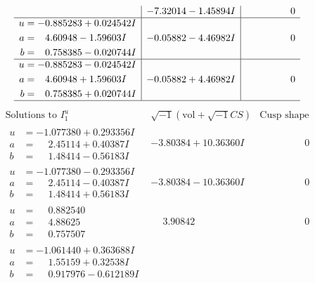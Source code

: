 \documentclass[1p]{elsarticle_modified}
\theoremstyle{definition}
\newcommand{\I}{\sqrt{-1}}
\begin{document}
$$\begin{array}{c|c|c}
 & -7.32014 - 1.45894 I & \phantom{-0.000000 } 0 \\ \hline\begin{aligned}
u &= -0.885283 + 0.024542 I \\
a &= \phantom{-}4.60948 - 1.59603 I \\
b &= \phantom{-}0.758385 - 0.020744 I\end{aligned}
 & -0.05882 - 4.46982 I & \phantom{-0.000000 } 0 \\ \hline\begin{aligned}
u &= -0.885283 - 0.024542 I \\
a &= \phantom{-}4.60948 + 1.59603 I \\
b &= \phantom{-}0.758385 + 0.020744 I\end{aligned}
 & -0.05882 + 4.46982 I & \phantom{-0.000000 } 0\\
 \hline 
 \end{array}$$\newpage$$\begin{array}{c|c|c}  
\text{Solutions to }I^u_{1}& \I (\text{vol} + \sqrt{-1}CS) & \text{Cusp shape}\\
 \hline 
\begin{aligned}
u &= -1.077380 + 0.293356 I \\
a &= \phantom{-}2.45114 + 0.40387 I \\
b &= \phantom{-}1.48414 - 0.56183 I\end{aligned}
 & -3.80384 + 10.36360 I & \phantom{-0.000000 } 0 \\ \hline\begin{aligned}
u &= -1.077380 - 0.293356 I \\
a &= \phantom{-}2.45114 - 0.40387 I \\
b &= \phantom{-}1.48414 + 0.56183 I\end{aligned}
 & -3.80384 - 10.36360 I & \phantom{-0.000000 } 0 \\ \hline\begin{aligned}
u &= \phantom{-}0.882540\phantom{ +0.000000I} \\
a &= \phantom{-}4.88625\phantom{ +0.000000I} \\
b &= \phantom{-}0.757507\phantom{ +0.000000I}\end{aligned}
 & \phantom{-}3.90842\phantom{ +0.000000I} & \phantom{-0.000000 } 0 \\ \hline\begin{aligned}
u &= -1.061440 + 0.363688 I \\
a &= \phantom{-}1.55159 + 0.32538 I \\
b &= \phantom{-}0.917976 - 0.612189 I\end{aligned}

\end{array}$$
\end{document}
